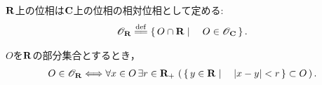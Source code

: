 	\begin{screen}
		\begin{dfn}[$\R$上の位相]
			$\R$上の位相は$\mathbf{C}$上の位相の相対位相として定める:
			\begin{align}
				\mathscr{O}_\R \defeq \Set{O \cap \R}{O \in \mathscr{O}_\C}.
			\end{align}
		\end{dfn}
	\end{screen}
	
	\begin{screen}
		\begin{thm}[$\R$の開集合はボールから成る]
			$O$を$\R$の部分集合とするとき，
			\begin{align}
				O \in \mathscr{O}_{\mathbf{R}} \Longleftrightarrow
				\forall x \in O\, \exists r \in \mathbf{R}_+\, \left(\, \left\{\, y \in \mathbf{R} \mid \quad |x-y| < r\, \right\} \subset O\, \right).
			\end{align}
		\end{thm}
	\end{screen}
	
